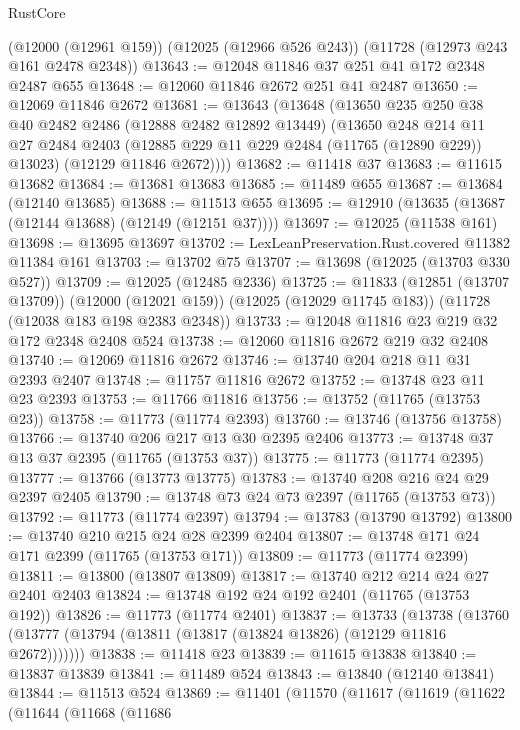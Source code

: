 \begin{lexlean}{RustCore}
\begin{coremodule}
    (@12000 (@12961 @159))
    (@12025 (@12966 @526 @243))
    (@11728 (@12973 @243 @161 @2478 @2348))
@13643 := @12048 @11846 @37 @251 @41 @172 @2348 @2487 @655
@13648 := @12060 @11846 @2672 @251 @41 @2487
@13650 := @12069 @11846 @2672
@13681 := @13643
    (@13648
      (@13650
        @235
        @250
        @38
        @40
        @2482
        @2486
        (@12888 @2482 @12892 @13449)
        (@13650
          @248
          @214
          @11
          @27
          @2484
          @2403
          (@12885 @229 @11 @229 @2484 (@11765 (@12890 @229)) @13023)
          (@12129 @11846 @2672))))
@13682 := @11418 @37
@13683 := @11615 @13682
@13684 := @13681 @13683
@13685 := @11489 @655
@13687 := @13684 (@12140 @13685)
@13688 := @11513 @655
@13695 := @12910 (@13635 (@13687 (@12144 @13688) (@12149 (@12151 @37))))
@13697 := @12025 (@11538 @161)
@13698 := @13695 @13697
@13702 := LexLeanPreservation.Rust.covered @11382 @11384 @161
@13703 := @13702 @75
@13707 := @13698 (@12025 (@13703 @330 @527))
@13709 := @12025 (@12485 @2336)
@13725 := @11833
    (@12851 (@13707 @13709))
    (@12000 (@12021 @159))
    (@12025 (@12029 @11745 @183))
    (@11728 (@12038 @183 @198 @2383 @2348))
@13733 := @12048 @11816 @23 @219 @32 @172 @2348 @2408 @524
@13738 := @12060 @11816 @2672 @219 @32 @2408
@13740 := @12069 @11816 @2672
@13746 := @13740 @204 @218 @11 @31 @2393 @2407
@13748 := @11757 @11816 @2672
@13752 := @13748 @23 @11 @23 @2393
@13753 := @11766 @11816
@13756 := @13752 (@11765 (@13753 @23))
@13758 := @11773 (@11774 @2393)
@13760 := @13746 (@13756 @13758)
@13766 := @13740 @206 @217 @13 @30 @2395 @2406
@13773 := @13748 @37 @13 @37 @2395 (@11765 (@13753 @37))
@13775 := @11773 (@11774 @2395)
@13777 := @13766 (@13773 @13775)
@13783 := @13740 @208 @216 @24 @29 @2397 @2405
@13790 := @13748 @73 @24 @73 @2397 (@11765 (@13753 @73))
@13792 := @11773 (@11774 @2397)
@13794 := @13783 (@13790 @13792)
@13800 := @13740 @210 @215 @24 @28 @2399 @2404
@13807 := @13748 @171 @24 @171 @2399 (@11765 (@13753 @171))
@13809 := @11773 (@11774 @2399)
@13811 := @13800 (@13807 @13809)
@13817 := @13740 @212 @214 @24 @27 @2401 @2403
@13824 := @13748 @192 @24 @192 @2401 (@11765 (@13753 @192))
@13826 := @11773 (@11774 @2401)
@13837 := @13733
    (@13738 (@13760 (@13777 (@13794 (@13811 (@13817 (@13824 @13826) (@12129 @11816 @2672)))))))
@13838 := @11418 @23
@13839 := @11615 @13838
@13840 := @13837 @13839
@13841 := @11489 @524
@13843 := @13840 (@12140 @13841)
@13844 := @11513 @524
@13869 := @11401
    (@11570
      (@11617
        (@11619
          (@11622
            (@11644
              (@11668
                (@11686

\end{coremodule}
\end{lexlean}
